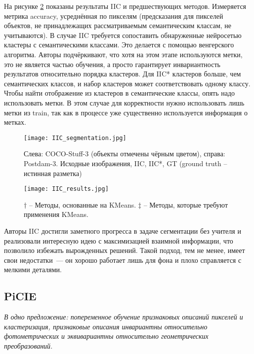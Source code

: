     На рисунке \ref{fig:iic_results} показаны результаты IIC и предшествующих методов.
    Измеряется метрика accuracy, усреднённая по пикселям (предсказания для пикселей объектов, не принадлежащих рассматриваемым семантическим классам, не учитываются). 
    В случае IIC требуется сопоставить обнаруженные нейросетью кластеры с семантическими классами.
    Это делается с помощью венгерского алгоритма.
    Авторы подчёркивают, что хотя на этом этапе используются метки, это не является частью обучения, 
    а просто гарантирует инвариантность результатов относительно порядка кластеров.
    Для IIC* кластеров больше, чем семантических классов, и набор кластеров может соответствовать одному классу.
    Чтобы найти отображение из кластеров в семантические классы, опять надо использовать метки.
    В этом случае для корректности нужно использовать лишь метки из train, так как в процессе уже существенно используется информация о метках.

    \begin{figure}
        \centering
        \texttt{[image: IIC\_segmentation.jpg]}
        \caption{Слева: COCO-Stuff-3 (объекты отмечены чёрным цветом), справа: Postdam-3.
        Исходные изображения, IIC, IIC*, GT (ground truth -- истинная разметка)\label{fig:iic_segmentation}}
    \end{figure}

    \begin{figure}
        \centering
        \texttt{[image: IIC\_results.jpg]}
        \caption{$\dagger$ -- Методы, основанные на KMeans. 
        $\ddagger$ -- Методы, которые требуют применения KMeans.\label{fig:iic_results}}
    \end{figure}

    \bigskip
    Авторы IIC достигли заметного прогресса в задаче сегментации без учителя и 
    реализовали интересную идею с максимизацией взаимной информации, что позволило избежать вырожденных решений.
    Такой подход, тем не менее, имеет свои недостатки~--- он хорошо работает лишь для фона и плохо справляется с мелкими деталями.

    \FloatBarrier
\subsection{PiCIE}
    \textit{В одно предложение: попеременное обучение признаковых описаний пикселей и кластеризация,
    признаковые описания инвариантны относительно фотометрических и эквивариантны относительно геометрических преобразований.}
    \bigskip

